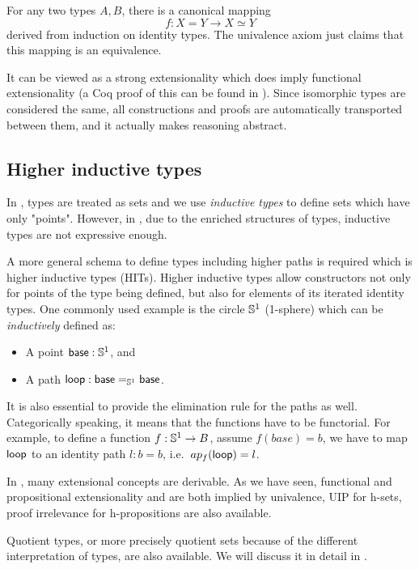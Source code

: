 For any two types $A, B$, there is a canonical mapping $$f : X = Y \to X \simeq Y$$ derived from induction on identity types. The univalence axiom just claims that this mapping is an equivalence. 


It can be viewed as a strong extensionality which does imply functional extensionality (a Coq proof of this can be found in \cite{uafe}). 
Since isomorphic types are considered the same, all constructions and proofs are automatically transported between them, and it actually makes reasoning abstract.


\subsection{Higher inductive types}\label{HITs}

In \itt, types are treated as sets and we use \emph{inductive types} to define sets which have only "points". However, in \hott, due to the enriched structures of types, inductive types are not expressive enough.

A more general schema to define types including higher paths is required which is higher inductive types (HITs). Higher inductive types allow constructors not only for points of the type being defined, but also for elements of its iterated identity types.
One commonly used example is the circle $\Sn^1$ (1-sphere) which can be \emph{inductively} defined as:

\begin{itemize}
\item A point $\base:\Sn^1$, and
\item A path $\lloop : {\id[\Sn^1]\base\base}$.
\end{itemize}

It is also essential to provide the elimination rule for the paths as well. Categorically speaking, it means that the functions have to be functorial. For example, to define a function $f :\Sn^1 \rightarrow B$, assume $f(base)=b$, we have to map $\lloop$ to an identity path $l : b = b$, i.e.\ $ap_{f}(\lloop)=l$.


In \hott, many extensional concepts are derivable. As we have seen, functional and propositional extensionality and are both implied by univalence, UIP for h-sets, proof irrelevance for h-propositions are also available.

Quotient types, or more precisely quotient sets because of the different interpretation of types, are also available. We will discuss it in detail in .

